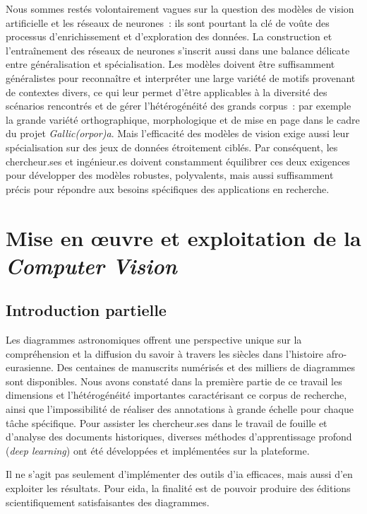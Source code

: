 \documentclass[a4paper,12pt,twoside]{book}
\newcommand{\eida}{\gls{eida}\xspace}
\newcommand{\dl}{\emph{deep learning}\xspace}
\newcommand{\ia}{\gls{ia}\xspace}
\newcommand{\gaga}{\emph{Gallic(orpor)a}\xspace}
\begin{document}
Nous sommes restés volontairement vagues sur la question des modèles de
vision artificielle et les réseaux de neurones~: ils sont pourtant la
clé de voûte des processus d'enrichissement et d'exploration des données. La construction et l'entraînement des réseaux de neurones s'inscrit aussi dans une balance
délicate entre généralisation et spécialisation. Les modèles doivent
être suffisamment généralistes pour reconnaître et interpréter une large
variété de motifs provenant de contextes divers, ce qui leur permet
d'être applicables à la diversité des scénarios rencontrés et de gérer
l'hétérogénéité des grands corpus~: par exemple la grande variété
orthographique, morphologique et de mise en page dans le cadre du projet
\gaga. Mais l'efficacité des modèles de vision exige aussi leur
spécialisation sur des jeux de données étroitement ciblés. Par
conséquent, les chercheur.ses et ingénieur.es doivent constamment équilibrer
ces deux exigences pour développer des modèles robustes, polyvalents,
mais aussi suffisamment précis pour répondre aux besoins spécifiques des
applications en recherche.

    \part{Mise en œuvre et exploitation de la \emph{Computer Vision}}

\chapter*{Introduction partielle}

Les diagrammes astronomiques offrent une perspective unique sur la
compréhension et la diffusion du savoir à travers les
siècles dans l'histoire afro-eurasienne. Des centaines de manuscrits
numérisés et des milliers de diagrammes sont disponibles. Nous avons
constaté dans la première partie de ce travail les dimensions et
l'hétérogénéité importantes caractérisant ce corpus de recherche, ainsi
que l'impossibilité de réaliser des annotations à grande échelle pour
chaque tâche spécifique. Pour assister les chercheur.ses dans le travail de
fouille et d'analyse des documents historiques, diverses méthodes
d'apprentissage profond (\dl) ont été développées et
implémentées sur la plateforme.

Il ne s'agit pas seulement d'implémenter des outils d'\ia efficaces,
mais aussi d'en exploiter les résultats. Pour \eida, la finalité est de
pouvoir produire des éditions scientifiquement satisfaisantes des
diagrammes.
\end{document}
